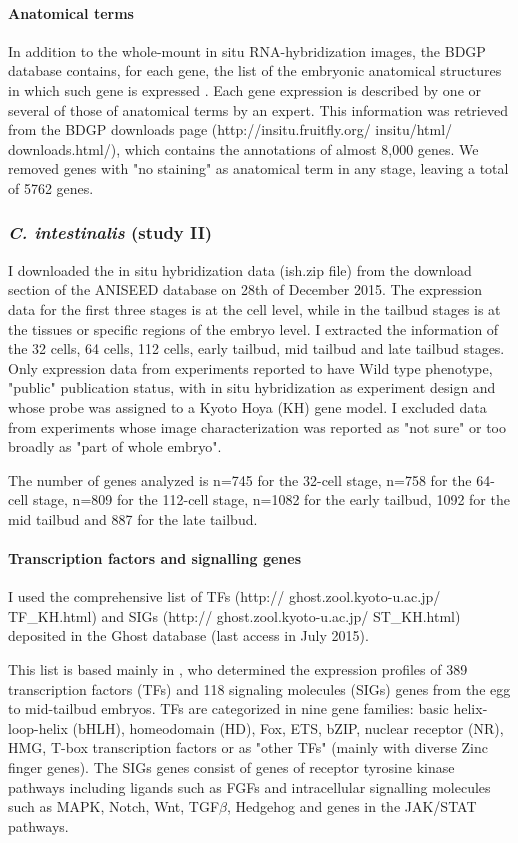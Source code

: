 \paragraph{Anatomical terms}
In addition to the whole-mount in situ RNA-hybridization images, the BDGP database contains, for each gene, the list of the embryonic anatomical structures in which such gene is expressed \citep{Tomancak2007}. Each gene expression is described by one or several of those of anatomical terms by an expert. 
This information was retrieved from the BDGP downloads page (http://insitu.fruitfly.org/ insitu/html/ downloads.html/), which contains the annotations of almost 8,000 genes. We removed genes with "no staining" as anatomical term in any stage, leaving a total of 5762 genes.

\subsubsection{\textit{C. intestinalis} (study II)}

I downloaded the in situ hybridization data (ish.zip file) from the download section of the ANISEED database on 28th of December 2015. 
The expression data for the first three stages is at the cell level, while in the tailbud stages is at the tissues or specific regions of the embryo level. 
I extracted the information of the 32 cells, 64 cells, 112 cells, early tailbud, mid tailbud and late tailbud stages. Only expression data from experiments reported to have Wild type phenotype, "public" publication status, with in situ hybridization as experiment design and whose probe was assigned to a Kyoto Hoya (KH) \citep{Satou2008} gene model.
I excluded data from experiments whose image characterization was reported as "not sure" or too broadly as "part of whole embryo".

The number of genes analyzed is n=745 for the 32-cell stage, n=758 for the 64-cell stage, n=809 for the 112-cell stage, n=1082 for the early tailbud, 1092 for the mid tailbud and 887 for the late tailbud. 

\paragraph{Transcription factors and signalling genes}
I used the comprehensive list of TFs (http:// ghost.zool.kyoto-u.ac.jp/ TF\_KH.html) and SIGs (http:// ghost.zool.kyoto-u.ac.jp/ ST\_KH.html) deposited in the Ghost database (last access in July 2015).
 
This list is based mainly in \citet{Imai2004}, who determined the expression profiles of 389 transcription factors (TFs) and 118 signaling molecules (SIGs) genes from the egg to mid-tailbud embryos. TFs are categorized in nine gene families: basic helix-loop-helix (bHLH), homeodomain (HD), Fox, ETS, bZIP, nuclear receptor (NR), HMG, T-box transcription factors or as "other TFs" (mainly with diverse Zinc finger genes).
The SIGs genes consist of genes of receptor tyrosine kinase pathways including ligands such as FGFs and intracellular signalling molecules such as MAPK, Notch, Wnt, TGF$\beta$, Hedgehog and genes in the JAK/STAT pathways. 

